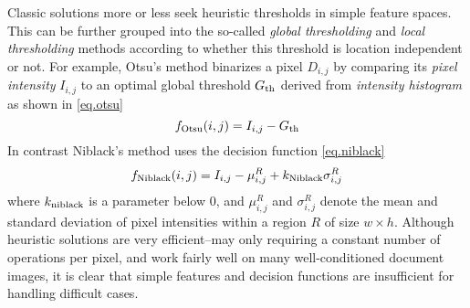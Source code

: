 \documentclass[onecolumn,11pt,draftcls,journal]{IEEEtran}
\begin{document}
Classic solutions more or less seek heuristic thresholds in simple feature spaces. 
This can be further grouped into the so-called {\textit{global thresholding}} and {\textit{local thresholding}} methods \cite{Combined2014} according to whether this threshold is location independent or not.
For example, Otsu's method \cite{Otsu1975} binarizes a pixel $D_{i,j}$ by comparing its \textit{pixel intensity} $I_{i,j}$ to an optimal global threshold $G_{\rm{th}}$ derived from  \textit{intensity histogram} \cite{Otsu1975} as shown in \eqref{eq.otsu}
\begin{equation}
f_{\rm{Otsu}}(i,j)=I_{i,j} - G_{\rm{th}}
\label{eq.otsu}
\end{equation}
In contrast Niblack's method \cite{Niblack1986} uses the decision function \eqref{eq.niblack}
\begin{equation}
f_{\rm{Niblack}}(i,j)= I_{i,j}-\mu^R_{i,j} +k_{\rm{Niblack}}\sigma^R_{i,j} 
\label{eq.niblack}
\end{equation}
where $k_{\rm{niblack}}$ is a parameter below 0, and $\mu^R_{i,j}$ and $\sigma^R_{i,j}$ denote the mean and standard deviation of pixel intensities within a region $R$ of size $w\!\!\times\!\!h$. 
Although heuristic solutions are very efficient--may only requiring a constant number of operations per pixel, and work fairly well on many well-conditioned document images, it is clear that simple features and decision functions are insufficient for handling difficult cases. 
\end{document}
